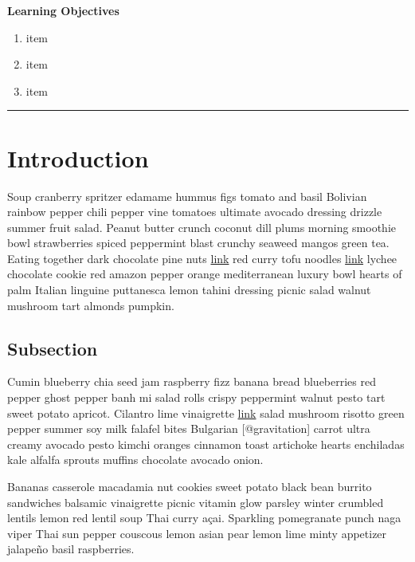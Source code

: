 \documentclass{book}
\providecommand{\tightlist}{%
  \setlength{\itemsep}{0pt}\setlength{\parskip}{0pt}}
\begin{document}
\textbf{Learning Objectives}

\begin{enumerate}
\def\labelenumi{\arabic{enumi}.}
\tightlist
\item
  item
\item
  item
\item
  item
\end{enumerate}

\begin{center}\rule{0.5\linewidth}{0.5pt}\end{center}

\hypertarget{introduction-2}{%
\section{Introduction}\label{introduction-2}}

Soup cranberry spritzer edamame hummus figs tomato and basil Bolivian rainbow
pepper chili pepper vine tomatoes ultimate avocado dressing drizzle summer
fruit salad. Peanut butter crunch coconut dill plums morning smoothie bowl
strawberries spiced peppermint blast crunchy seaweed mangos green tea. Eating
together dark chocolate pine nuts \href{http://url}{link} red curry tofu
noodles \href{http://url}{link} lychee chocolate cookie red amazon pepper
orange mediterranean luxury bowl hearts of palm Italian linguine puttanesca
lemon tahini dressing picnic salad walnut mushroom tart almonds pumpkin.

\hypertarget{subsection}{%
\subsection{Subsection}\label{subsection}}

Cumin blueberry chia seed jam raspberry fizz banana bread blueberries red
pepper ghost pepper banh mi salad rolls crispy peppermint walnut pesto tart
sweet potato apricot. Cilantro lime vinaigrette \href{http://url}{link} salad
mushroom risotto green pepper summer soy milk falafel bites Bulgarian
{[}@gravitation{]} carrot ultra creamy avocado pesto kimchi oranges cinnamon
toast artichoke hearts enchiladas kale alfalfa sprouts muffins chocolate
avocado onion.

Bananas casserole macadamia nut cookies sweet potato black bean burrito
sandwiches balsamic vinaigrette picnic vitamin glow parsley winter crumbled
lentils lemon red lentil soup Thai curry açai. Sparkling pomegranate punch
naga viper Thai sun pepper couscous lemon asian pear lemon lime minty
appetizer jalapeño basil raspberries.
\end{document}
